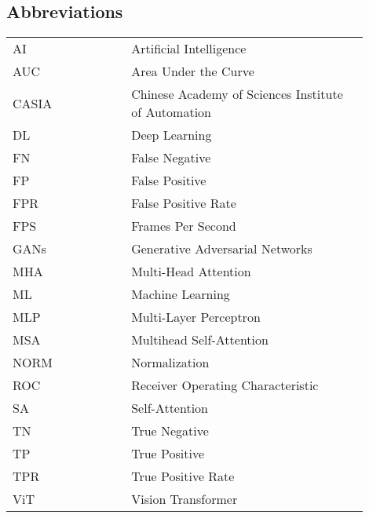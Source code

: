 \begin{center}
    \section*{Abbreviations}
    \begin{table}[h]
        \centering
        \renewcommand{\arraystretch}{1.5}
        \begin{tabular}{@{}p{0.3\linewidth}p{0.6\linewidth}@{}}
            AI    & Artificial Intelligence                             \\
            AUC   & Area Under the Curve                                \\
            CASIA & Chinese Academy of Sciences Institute of Automation \\
            DL    & Deep Learning                                       \\
            FN    & False Negative                                      \\
            FP    & False Positive                                      \\
            FPR   & False Positive Rate                                 \\
            FPS   & Frames Per Second                                   \\
            GANs  & Generative Adversarial Networks                     \\
            MHA   & Multi-Head Attention                                \\
            ML    & Machine Learning                                    \\
            MLP   & Multi-Layer Perceptron                              \\
            MSA   & Multihead Self-Attention                            \\
            NORM  & Normalization                                       \\
            ROC   & Receiver Operating Characteristic                   \\
            SA    & Self-Attention                                      \\
            TN    & True Negative                                       \\
            TP    & True Positive                                       \\
            TPR   & True Positive Rate                                  \\
            ViT   & Vision Transformer                                  \\
        \end{tabular}
    \end{table}
\end{center}
